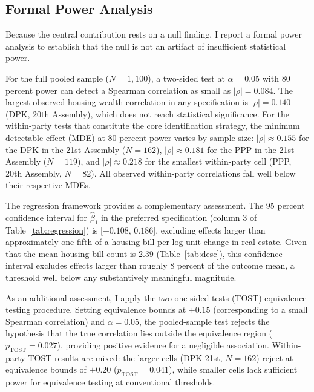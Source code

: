 \documentclass[11pt]{article}
\begin{document}
\subsection{Formal Power Analysis}
\label{sec:power}

Because the central contribution rests on a null finding, I report a formal power analysis to establish that the null is not an artifact of insufficient statistical power.

For the full pooled sample ($N = 1{,}100$), a two-sided test at $\alpha = 0.05$ with 80 percent power can detect a Spearman correlation as small as $|\rho| = 0.084$. The largest observed housing-wealth correlation in any specification is $|\rho| = 0.140$ (DPK, 20th Assembly), which does not reach statistical significance. For the within-party tests that constitute the core identification strategy, the minimum detectable effect (MDE) at 80 percent power varies by sample size: $|\rho| \approx 0.155$ for the DPK in the 21st Assembly ($N = 162$), $|\rho| \approx 0.181$ for the PPP in the 21st Assembly ($N = 119$), and $|\rho| \approx 0.218$ for the smallest within-party cell (PPP, 20th Assembly, $N = 82$). All observed within-party correlations fall well below their respective MDEs.

The regression framework provides a complementary assessment. The 95 percent confidence interval for $\hat{\beta}_1$ in the preferred specification (column 3 of Table~\ref{tab:regression}) is [$-0.108$, $0.186$], excluding effects larger than approximately one-fifth of a housing bill per log-unit change in real estate. Given that the mean housing bill count is 2.39 (Table~\ref{tab:desc}), this confidence interval excludes effects larger than roughly 8 percent of the outcome mean, a threshold well below any substantively meaningful magnitude.

As an additional assessment, I apply the two one-sided tests (TOST) equivalence testing procedure. Setting equivalence bounds at $\pm 0.15$ (corresponding to a small Spearman correlation) and $\alpha = 0.05$, the pooled-sample test rejects the hypothesis that the true correlation lies outside the equivalence region ($p_{\text{TOST}} = 0.027$), providing positive evidence for a negligible association. Within-party TOST results are mixed: the larger cells (DPK 21st, $N = 162$) reject at equivalence bounds of $\pm 0.20$ ($p_{\text{TOST}} = 0.041$), while smaller cells lack sufficient power for equivalence testing at conventional thresholds.


\end{document}
